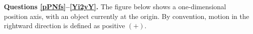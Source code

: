 \documentclass[]{exam}
\begin{document}
\textbf{Questions \ref{pPNfs}--\ref{Yi2yY}.} The figure below shows a one-dimensional  position axis, with an object currently at the origin. By convention, motion in the rightward direction is defined as positive $\left(+\right)$.

\begin{center}
\end{center}
\end{document}
